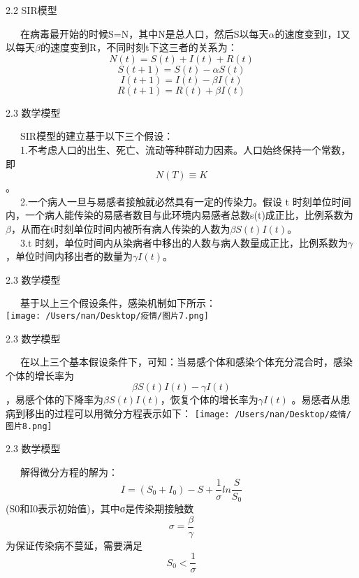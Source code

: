 \documentclass[
  ignorenonframetext,
]{beamer}
\begin{document}
\begin{frame}{2.2 SIR模型}
\protect\hypertarget{sir-2}{}

  在病毒最开始的时候S=N，其中N是总人口，然后S以每天\(\alpha\)的速度变到I，I又以每天\(\beta\)的速度变到R，不同时刻t下这三者的关系为：\\
\[ N(t) = S(t) + I(t) + R(t) \] \[S(t+1) = S(t) - αS(t) \]
\[I(t+1) = I(t) - βI(t) \] \[ R(t+1)= R(t)+βI(t)\]

\end{frame}

\begin{frame}{2.3 数学模型}
\protect\hypertarget{section-6}{}

  SIR模型的建立基于以下三个假设：\\
  1.不考虑人口的出生、死亡、流动等种群动力因素。人口始终保持一个常数，即\[N(T) \equiv K\]。\\
  2.一个病人一旦与易感者接触就必然具有一定的传染力。假设 t
时刻单位时间内，一个病人能传染的易感者数目与此环境内易感者总数s(t)成正比，比例系数为\(\beta\)，从而在t时刻单位时间内被所有病人传染的人数为\(\beta S(t)I(t)\)。\\
  3.t
时刻，单位时间内从染病者中移出的人数与病人数量成正比，比例系数为\(\gamma\)，单位时间内移出者的数量为\(\gamma I(t)\)。

\end{frame}

\begin{frame}{2.3 数学模型}
\protect\hypertarget{section-7}{}

  基于以上三个假设条件，感染机制如下所示：\\
\texttt{[image: /Users/nan/Desktop/疫情/图片7.png]}

\end{frame}

\begin{frame}{2.3 数学模型}
\protect\hypertarget{section-8}{}

  在以上三个基本假设条件下，可知：当易感个体和感染个体充分混合时，感染个体的增长率为\[\beta S(t)I(t)- \gamma I(t)\]
，易感个体的下降率为\(\beta S(t)I(t)\)，恢复个体的增长率为\(\gamma I(t)\)
。易感者从患病到移出的过程可以用微分方程表示如下：
\texttt{[image: /Users/nan/Desktop/疫情/图片8.png]}

\end{frame}

\begin{frame}{2.3 数学模型}
\protect\hypertarget{section-9}{}

  解得微分方程的解为：\\
\[I=(S_0+I_0)-S+ \frac {1} {\sigma} ln \frac {S} {S_0}\]
(S0和I0表示初始值)，其中σ是传染期接触数\\
\[σ = \frac {\beta} {\gamma}\]
为保证传染病不蔓延，需要满足\[S_0< \frac {1} {\sigma}\]

\end{frame}
\end{document}
